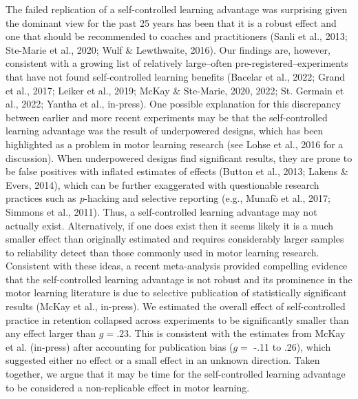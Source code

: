 \documentclass[
  doc, donotrepeattitle,floatsintext]{apa7}
\begin{document}
The failed replication of a self-controlled learning advantage was surprising given the dominant view for the past 25 years has been that it is a robust effect and one that should be recommended to coaches and practitioners (Sanli et al., 2013; Ste-Marie et al., 2020; Wulf \& Lewthwaite, 2016). Our findings are, however, consistent with a growing list of relatively large--often pre-registered--experiments that have not found self-controlled learning benefits (Bacelar et al., 2022; Grand et al., 2017; Leiker et al., 2019; McKay \& Ste-Marie, 2020, 2022; St. Germain et al., 2022; Yantha et al., in-press). One possible explanation for this discrepancy between earlier and more recent experiments may be that the self-controlled learning advantage was the result of underpowered designs, which has been highlighted as a problem in motor learning research (see Lohse et al., 2016 for a discussion). When underpowered designs find significant results, they are prone to be false positives with inflated estimates of effects (Button et al., 2013; Lakens \& Evers, 2014), which can be further exaggerated with questionable research practices such as \emph{p}-hacking and selective reporting (e.g., Munafò et al., 2017; Simmons et al., 2011). Thus, a self-controlled learning advantage may not actually exist. Alternatively, if one does exist then it seems likely it is a much smaller effect than originally estimated and requires considerably larger samples to reliability detect than those commonly used in motor learning research. Consistent with these ideas, a recent meta-analysis provided compelling evidence that the self-controlled learning advantage is not robust and its prominence in the motor learning literature is due to selective publication of statistically significant results (McKay et al., in-press). We estimated the overall effect of self-controlled practice in retention collapsed across experiments to be significantly smaller than any effect larger than \(g = .23\). This is consistent with the estimates from McKay et al. (in-press) after accounting for publication bias (\(g =\) -.11 to .26), which suggested either no effect or a small effect in an unknown direction. Taken together, we argue that it may be time for the self-controlled learning advantage to be considered a non-replicable effect in motor learning.
\end{document}
